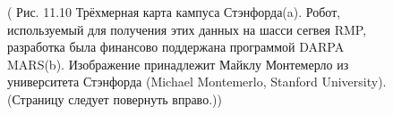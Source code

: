 \documentclass[10pt,a4paper]{article}
\begin{document}
\begin{figure}[H]
	\caption{ ( Рис. 11.10   Трёхмерная карта кампуса Стэнфорда(a). Робот, используемый для получения этих данных на шасси сегвея RMP, разработка была финансово поддержана программой DARPA MARS(b). Изображение принадлежит Майклу Монтемерло из университета Стэнфорда (Michael Montemerlo, Stanford University). (Страницу следует повернуть вправо.)) }
	\label{fig:1110orig}
\end{figure}
\end{document}
